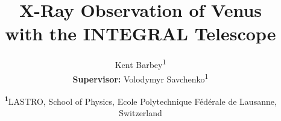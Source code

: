 \documentclass[
	a4paper, %
	10pt, %
	unnumberedsections, %
	twoside, %
]{LTJournalArticle}
\title{X-Ray Observation of Venus\\ with the INTEGRAL Telescope} %
\author{%
	Kent Barbey\textsuperscript{1} \\ \textbf{Supervisor:} Volodymyr Savchenko\textsuperscript{1}
}
\date{\footnotesize\textsuperscript{\textbf{1}}LASTRO, School of Physics, Ecole Polytechnique Fédérale de Lausanne, Switzerland}
\begin{document}
\maketitle %
\tableofcontents















\nocite{*}
\printbibliography %

\end{document}
